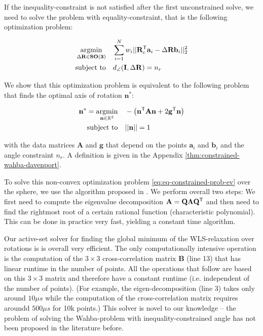 If the inequality-constraint is not satisfied after the first unconstrained solve, we need to solve the problem with equality-constraint, that is the following optimization problem: 

\begin{equation}
	\label{eq:tls-rwls-eq}
	\begin{aligned}
		\operatorname*{argmin}_{\Delta \mathbf{R} \in \mathbf{SO(3)}}  \quad &\sum_{i=1}^{N} w_i ||\mathbf{R}_c^{\mathsf{T}} \mathbf{a}_i - \Delta\mathbf{R} \mathbf{b}_i ||_2^2 \\
		\text{subject to} \quad &d_{\angle}(\mathbf{I}, \Delta\mathbf{R}) = n_r
	\end{aligned}
\end{equation}

We show that this optimization problem is equivalent to the following problem that finds the optimal axis of rotation $\mathbf{n}^*$:

\begin{equation}
	\begin{aligned}
		\label{eq:eq-constrained-prob-ev}
		\mathbf{n}^* = \operatorname*{argmin}_{\mathbf{n} \in \mathbb{R}^3} \quad &-\left(\mathbf{n}^{\mathsf{T}} \mathbf{A} \mathbf{n} + 2 \mathbf{g}^{\mathsf{T}} \mathbf{n} \right)\\
		\text{subject to} \quad &|| \mathbf{n}|| = 1\\
	\end{aligned}
\end{equation}

with the data matrices $\mathbf{A}$ and $\mathbf{g}$ that depend on the points $\mathbf{a}_i$ and $\mathbf{b}_i$ and the angle constraint $n_r$. A definition is given in the Appendix \ref{thm:constrained-wahba-davenport}.

To solve this non-convex optimization problem \ref{eq:eq-constrained-prob-ev} over the sphere, we use the algorithm proposed in \cite{10.1007/978-3-642-75536-1_57}. We perform overall two steps: We first need to compute the eigenvalue decomposition  $\mathbf{A} = \mathbf{Q}\mathbf{\Lambda}\mathbf{Q}^{\mathsf{T}}$ and then need to find the rightmost root of a certain rational function (characteristic polynomial). This can be done in practice very fast, yielding a constant time algorithm.


Our active-set solver for finding the global minimum of the WLS-relaxation over rotations is is overall very efficient. The only computationally intensive operation is the computation of the $3 \times 3$ cross-correlation matrix $\mathbf{B}$ (line 13) that has linear runtime in the number of points. All the operations that follow are based on this $3 \times 3$ matrix and therefore have a constant runtime (i.e. independent of the number of points). (For example, the eigen-decomposition (line 3) takes only around $10 \mu s$ while the computation of the cross-correlation matrix requires aroundd $500 \mu s$ for 10k points.)
This solver is novel to our knowledge -- the problem of solving the Wahba-problem with inequality-constrained angle has not been proposed in the literature before.
